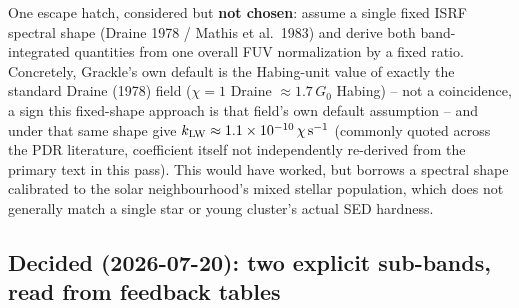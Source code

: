 One escape hatch, considered but \textbf{not chosen}: assume a single
fixed ISRF spectral shape (Draine 1978 / Mathis et al.\ 1983) and
derive both band-integrated quantities from one overall FUV
normalization by a fixed ratio. Concretely, Grackle's own default
 is the Habing-unit value of
exactly the standard Draine (1978) field ($\chi=1$ Draine
$\approx1.7\,G_0$ Habing) -- not a coincidence, a sign this fixed-shape
approach is that field's own default assumption -- and under that same
shape \citet{DraineBertoldi1996} give
$k_{\rm LW}\approx1.1\times10^{-10}\,\chi\,{\rm s^{-1}}$ (commonly
quoted across the PDR literature, coefficient itself not
independently re-derived from the primary text in this pass). This
would have worked, but borrows a spectral shape calibrated to the
solar neighbourhood's mixed stellar population, which does not
generally match a single star or young cluster's actual SED hardness.

\subsection{Decided (2026-07-20): two explicit sub-bands, read from
feedback tables}
\label{sec:fuv-two-bands}


